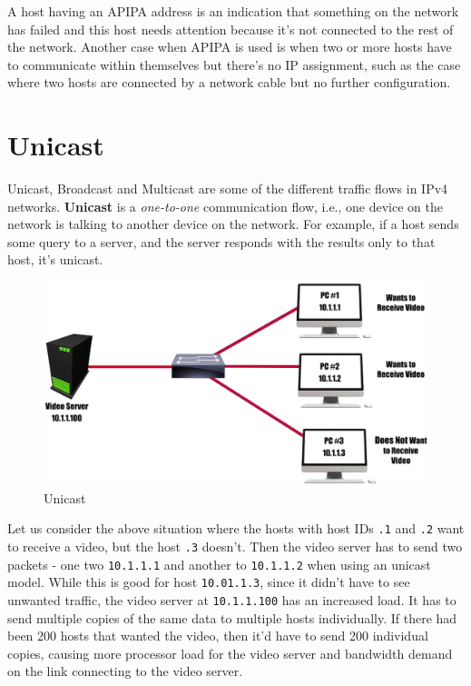 \noindent
A host having an APIPA address is an indication that something on the network has failed and this host needs attention because it's not connected to the rest of the network. Another case when APIPA is used is when two or more hosts have to communicate within themselves but there's no IP assignment, such as the case where two hosts are connected by a network cable but no further configuration. 

\section{Unicast} 
Unicast, Broadcast and Multicast are some of the different traffic flows in IPv4 networks. \textbf{Unicast} is a \textit{one-to-one} communication flow, i.e., one device on the network is talking to another device on the network. For example, if a host sends some query to a server, and the server responds with the results only to that host, it's unicast. 

\begin{figure}[H]
	\centering
	\includegraphics[width=0.7\linewidth]{"Mod1/chapters/1.6.a Unicast"}
	\caption{Unicast}
	\label{fig:unicast}
\end{figure}
\vspace{-15pt}

\noindent
Let us consider the above situation where the hosts with host IDs \verb|.1| and \verb|.2| want to receive a video, but the host \verb|.3| doesn't. Then the video server has to send two packets - one two \verb|10.1.1.1| and another to \verb|10.1.1.2| when using an unicast model. While this is good for host \verb|10.01.1.3|, since it didn't have to see unwanted traffic, the video server at \verb|10.1.1.100| has an increased load. It has to send multiple copies of the same data to multiple hosts individually. If there had been 200 hosts that wanted the video, then it'd have to send 200 individual copies, causing more processor load for the video server and bandwidth demand on the link connecting to the video server. 

